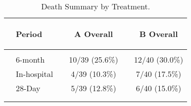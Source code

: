 \documentclass[dvips,10pt]{article}
\begin{document}
\clearpage
\begin{table}[t]
\caption
{ Death Summary by Treatment. }
\begin{center}
\begin{tabular}{ @{}l@{}
@{}l@{}@{}p{1.5em}@{}@{}c@{}@{}p{1.5em}@{}@{}c@{}
}
\hline

& \parbox{6em}{\begin{center}Period\end{center}} && \parbox{6em}{\begin{center}A Overall\end{center}} && \parbox{6em}{\begin{center}B Overall\end{center}} \\

\hline

\\
& 6-month && 10/39 (25.6\%) && 12/40 (30.0\%) \\
& In-hospital && 4/39 (10.3\%) && 7/40 (17.5\%) \\
& 28-Day && 5/39 (12.8\%) && 6/40 (15.0\%) \\
\\
\hline \\

\end{tabular}

\end{center}
 \end{table}
\clearpage

\begin{figure}
\end{figure}
\clearpage

\begin{figure}
\end{figure}
\clearpage
\end{document}
